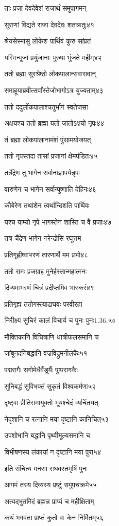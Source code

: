 ताः प्रजा देवदेवेशं राजार्थं समुपागमन्

सुराणां विद्यते राजा देवदेवः शतक्रतुः४१

श्रेयसेस्मासु लोकेश पार्थिवं कुरु सांप्रतं

यस्मिन्पूजां प्रयुंजानाः पुरुषा भुंजते महीम्४२

ततो ब्रह्मा सुरश्रेष्ठो लोकपालान्सवासवान्

समाहूयाब्रवीत्सर्वांस्तेजोभागोऽत्र युज्यताम्४३

ततो ददुर्लोकपालाश्चतुर्भागं स्वतेजसा

अक्षयश्च ततो ब्रह्मा यतो जातोऽक्षयो नृपः४४

तं ब्रह्मा लोकपालानामंशं पुंसामयोजयत्

ततो नृपस्तदा तासां प्रजानां क्षेमपंडितः४५

तत्रैंद्रेण तु भागेन सर्वानाज्ञापयेन्नृपः

वारुणेन च भागेन सर्वान्पुष्णाति देहिनः४६

कौबेरेण तथांशेन त्वर्थान्दिशति पार्थिवः

यश्च याम्यो नृपे भागस्तेन शास्ति च वै प्रजाः४७

तत्र चैंद्रेण भागेन नरेन्द्रोसि रघूत्तम

प्रतिगृह्णीष्वाभरणं तारणार्थे मम प्रभो४८

ततो रामः प्रजग्राह मुनेर्हस्तान्महात्मनः

दिव्यमाभरणं चित्रं प्रदीप्तमिव भास्करं४९

प्रतिगृह्य ततोगस्त्याद्राघवः परवीरहा

निरीक्ष्य सुचिरं कालं विचार्य च पुनः पुनः1.36.५०

मौक्तिकानि विचित्राणि धात्रीफलसमानि च

जांबूनदनिबद्धानि वज्रविद्रुमनीलकैः५१

पद्मरागैः सगोमेधैर्वैडूर्यैः पुष्परागकैः

सुनिबद्धं सुविभक्तं सुकृतं विश्वकर्मणा५२

दृष्ट्वा प्रीतिसमायुक्तो भूयश्चेदं व्यचिंतयत्

नेदृशानि च रत्नानि मया दृष्टानि कानिचित्५३

उपशोभानि बद्धानि पृथ्वीमूल्यसमानि च

विभीषणस्य लंकायां न दृष्टानि मया पुरा५४

इति संचित्य मनसा राघवस्तमृषिं पुनः

आगमं तस्य दिव्यस्य प्रष्टुं समुपचक्रमे५५

अत्यद्भुतमिदं ब्रह्मन्न प्राप्यं च महीक्षिताम्

कथं भगवता प्राप्तं कुतो वा केन निर्मितम्५६

